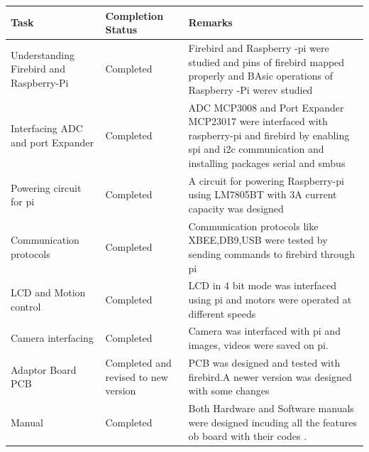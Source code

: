 \documentclass[a4paper,12pt,oneside]{book}
\begin{document}
	\begin{table}
		\centering
	\end{table}
	\begin{tabular}{ |p{4cm}|p{3cm}|p{6cm}|}
		\hline
		\textbf{Task} &  \textbf{Completion Status} &  \textbf{Remarks}\\
		\hline
		Understanding Firebird and Raspberry-Pi& Completed & Firebird and Raspberry -pi were studied and pins of firebird mapped properly and BAsic operations of Raspberry -Pi werev studied\\
		\hline
		Interfacing ADC and port Expander&Completed&ADC MCP3008 and Port Expander MCP23017 were interfaced with raspberry-pi and firebird by enabling spi and i2c communication and installing packages serial and smbus \\
		\hline
		Powering circuit for pi&Completed&A circuit for powering Raspberry-pi using LM7805BT with 3A current capacity was designed\\
		\hline
		Communication protocols&Completed& Communication protocols like XBEE,DB9,USB were tested by sending commands to firebird through pi\\
		\hline
		LCD and Motion control&Completed & LCD in 4 bit mode was interfaced using pi and motors were operated at different speeds\\
		\hline
		Camera interfacing&Completed & Camera was interfaced with pi and images, videos were saved on pi.\\
		\hline
		Adaptor Board PCB& Completed and revised to new version&PCB was designed and tested with firebird.A newer version was designed with some changes \\
		\hline
		Manual &Completed&Both Hardware and Software manuals were designed incuding all the features ob board with their codes .\\
		\hline
	\end{tabular}
	
\end{document}
